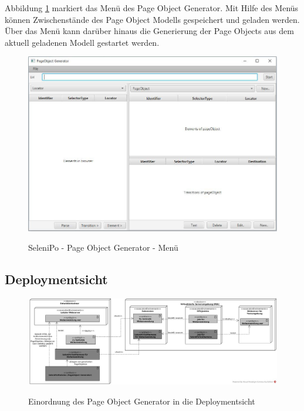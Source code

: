 \newpage

Abbildung \ref{fig:poGeneratorMenu} markiert das Menü des Page Object Generator. Mit Hilfe des Menüs können Zwischenstände des Page Object Modells gespeichert und geladen werden.
Über das Menü kann darüber hinaus die Generierung der Page Objects aus dem aktuell geladenen Modell gestartet werden.

\begin{figure}[htb]
  \centering  
  \includegraphics[scale=0.5]{img/poGeneratorMenu.JPG}\\
  \caption{SeleniPo - Page Object Generator - Menü}
  \label{fig:poGeneratorMenu}
\end{figure}

\subsection{Deploymentsicht}

\label{sec:deploymentsicht}
\begin{figure}[htb]
  \centering  
  \includegraphics[scale=0.32]{img/Deployment.jpg}\\
  \caption{Einordnung des Page Object Generator in die Deploymentsicht}
  \label{fig:deployment}
\end{figure}

